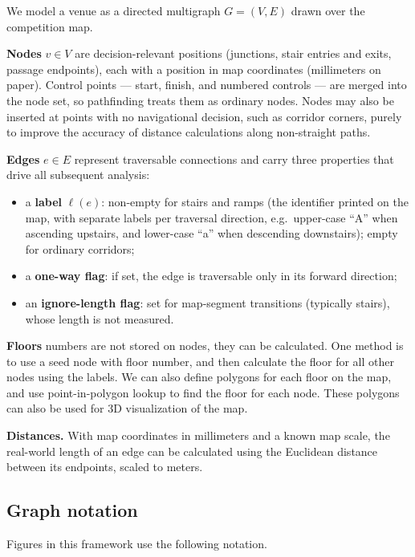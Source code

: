 \documentclass[11pt,a4paper,twocolumn]{article}
\begin{document}
We model a venue as a directed multigraph $G = (V, E)$ drawn over the
competition map.

\textbf{Nodes} $v \in V$ are decision-relevant positions (junctions, stair
entries and exits, passage endpoints), each with a position in map
coordinates (millimeters on paper). Control points --- start, finish, and
numbered controls --- are merged into the node set, so pathfinding treats
them as ordinary nodes. Nodes may also be inserted at points with no
navigational decision, such as corridor corners, purely to improve the
accuracy of distance calculations along non-straight paths.

\textbf{Edges} $e \in E$ represent traversable connections and carry three
properties that drive all subsequent analysis:

\begin{itemize}
    \item a \textbf{label} $\ell(e)$: non-empty for stairs and ramps (the
          identifier printed on the map, with separate labels per traversal
          direction, e.g.\ upper-case ``A'' when ascending upstairs, and lower-case ``a'' when descending downstairs); empty for
          ordinary corridors;
    \item a \textbf{one-way flag}: if set, the edge is traversable only in
          its forward direction;
    \item an \textbf{ignore-length flag}: set for map-segment transitions (typically stairs), whose length is not
          measured.
\end{itemize}

\textbf{Floors} numbers are not stored on nodes, they can be calculated. One method is to use a seed node with floor number, and then calculate the floor for all other nodes using the labels.
We can also define polygons for each floor on the map, and use point-in-polygon lookup to find the floor for each node. These polygons can also be used for 3D visualization of the map.

\textbf{Distances.} With map coordinates in millimeters and a known map
scale, the real-world length of an edge can be calculated using the Euclidean distance between its endpoints, scaled to meters.

\subsection{Graph notation}

Figures in this framework use the following notation.
\end{document}
